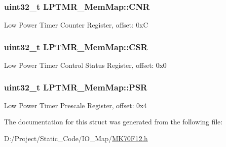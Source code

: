 \subsubsection[{C\+N\+R}]{\setlength{\rightskip}{0pt plus 5cm}uint32\+\_\+t L\+P\+T\+M\+R\+\_\+\+Mem\+Map\+::\+C\+N\+R}\label{struct_l_p_t_m_r___mem_map_adda036ea26ea5cc89d7957779c5680f0}
Low Power Timer Counter Register, offset\+: 0x\+C \hypertarget{struct_l_p_t_m_r___mem_map_a4dcb593756f09d67e3d064d95e3f2d68}{}
\subsubsection[{C\+S\+R}]{\setlength{\rightskip}{0pt plus 5cm}uint32\+\_\+t L\+P\+T\+M\+R\+\_\+\+Mem\+Map\+::\+C\+S\+R}\label{struct_l_p_t_m_r___mem_map_a4dcb593756f09d67e3d064d95e3f2d68}
Low Power Timer Control Status Register, offset\+: 0x0 \hypertarget{struct_l_p_t_m_r___mem_map_a05f0c5c90722e5a1757c262c818d2462}{}
\subsubsection[{P\+S\+R}]{\setlength{\rightskip}{0pt plus 5cm}uint32\+\_\+t L\+P\+T\+M\+R\+\_\+\+Mem\+Map\+::\+P\+S\+R}\label{struct_l_p_t_m_r___mem_map_a05f0c5c90722e5a1757c262c818d2462}
Low Power Timer Prescale Register, offset\+: 0x4 

The documentation for this struct was generated from the following file\+:\begin{DoxyCompactItemize}
\item 
D\+:/\+Project/\+Static\+\_\+\+Code/\+I\+O\+\_\+\+Map/\hyperlink{_m_k70_f12_8h}{M\+K70\+F12.\+h}\end{DoxyCompactItemize}
